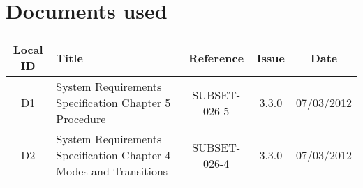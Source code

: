 \section{Documents used}
\begin{tabular}{|c|p{5cm}|c|c|c|}
\hline
Local ID & Title & Reference & Issue & Date \\ \hline
D1 & System Requirements Specification Chapter 5 Procedure & SUBSET-026-5 & 3.3.0 & 07/03/2012 \\ \hline
D2 & System Requirements Specification Chapter 4 Modes and Transitions & SUBSET-026-4 & 3.3.0 & 07/03/2012 \\
\hline
\end{tabular}
